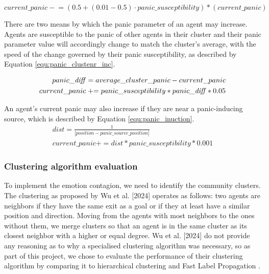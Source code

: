 \documentclass[9pt]{pnas-new}
\begin{document}
\begin{equation}
    current\_panic \mathrel{-}= (0.5 + (0.01 - 0.5) \cdot panic\_susceptibility) * (current\_panic)
    \label{equ:panic_decress}
\end{equation}

There are two means by which the panic parameter of an agent may increase. Agents are susceptible to the panic of other agents in their cluster and their panic parameter value will accordingly change to match the cluster's average, with the speed of the change governed by their panic susceptibility, as described by Equation \ref{equ:panic_clustenr_inc}. 

\begin{equation}
  \begin{aligned}
    panic\_\text{\textit{diff}} = average\_cluster\_panic - current\_panic \\
    current\_panic \mathrel{+}= panic\_susceptibility * panic\_\text{\textit{diff}} * 0.05
\end{aligned}
    \label{equ:panic_clustenr_inc}
\end{equation}

An agent's current panic may also increase if they are near a panic-inducing source, which is described by Equation \ref{equ:panic_inuction}.
\begin{equation}
    \begin{aligned}
        dist = \frac{1} {|position - panic\_source\_position|} \\
        current\_panic += dist * panic\_susceptibility * 0.001
    \end{aligned}
    \label{equ:panic_inuction}
\end{equation}

\subsubsection{Clustering algorithm evaluation}
To implement the emotion contagion, we need to identify the community clusters. The clustering as proposed by Wu et al. [2024] operates as follows: two agents are neighbors if they have the same exit as a goal or if they at least have a similar position and direction. Moving from the agents with most neighbors to the ones without them, we merge clusters so that an agent is in the same cluster as its closest neighbor with a higher or equal degree.
Wu et al. [2024] do not provide any reasoning as to why a specialised clustering algorithm was necessary, so as part of this project, we chose to evaluate the performance of their clustering algorithm by comparing it to hierarchical clustering and Fast Label Propagation \cite{Lovre_2023}.
\end{document}
